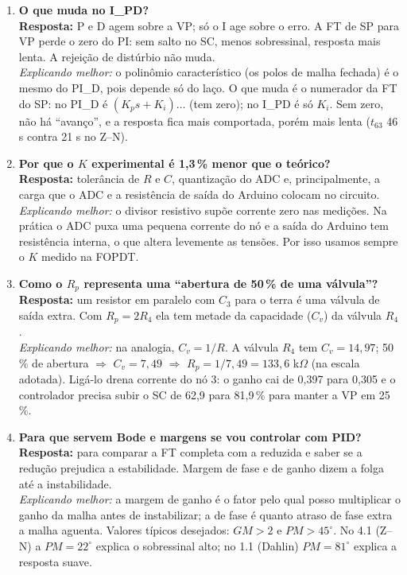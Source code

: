 \documentclass[11pt,a4paper]{article}
\newcommand{\Vc}[1]{V_{c#1}}
\newcommand{\Vin}{V_{in}}
\begin{document}
\begin{enumerate}[leftmargin=*]
\emph{Explicando melhor:} o SC máximo é 100\,\% (5 V) e em regime $\Vc3=K_3\cdot\Vin$. Logo $VP_{max}=0{,}397\cdot100$. Na prática, com $K$ medido, $\approx39{,}2\,\%$. Para qualquer SP, o SC em regime é $SP/K$ e precisa ficar entre 0 e 100\,\%.
\item \textbf{O que muda no I\_PD?}\\
\textbf{Resposta:} P e D agem sobre a VP; só o I age sobre o erro. A FT de SP para VP perde o zero do PI: sem salto no SC, menos sobressinal, resposta mais lenta. A rejeição de distúrbio não muda.\\
\emph{Explicando melhor:} o polinômio característico (os polos de malha fechada) é o mesmo do PI\_D, pois depende só do laço. O que muda é o numerador da FT do SP: no PI\_D é $(K_ps+K_i)\ldots$ (tem zero); no I\_PD é só $K_i$. Sem zero, não há ``avanço'', e a resposta fica mais comportada, porém mais lenta ($t_{63}$ 46 s contra 21 s no Z--N).
\item \textbf{Por que o $K$ experimental é 1,3\,\% menor que o teórico?}\\
\textbf{Resposta:} tolerância de $R$ e $C$, quantização do ADC e, principalmente, a carga que o ADC e a resistência de saída do Arduino colocam no circuito.\\
\emph{Explicando melhor:} o divisor resistivo supõe corrente zero nas medições. Na prática o ADC puxa uma pequena corrente do nó e a saída do Arduino tem resistência interna, o que altera levemente as tensões. Por isso usamos sempre o $K$ medido na FOPDT.
\item \textbf{Como o $R_p$ representa uma ``abertura de 50\,\% de uma válvula''?}\\
\textbf{Resposta:} um resistor em paralelo com $C_3$ para o terra é uma válvula de saída extra. Com $R_p=2R_4$ ela tem metade da capacidade ($C_v$) da válvula $R_4$.\\
\emph{Explicando melhor:} na analogia, $C_v=1/R$. A válvula $R_4$ tem $C_v=14{,}97$; 50\,\% de abertura $\Rightarrow$ $C_v=7{,}49$ $\Rightarrow$ $R_p=1/7{,}49=133{,}6$ k$\Omega$ (na escala adotada). Ligá-lo drena corrente do nó 3: o ganho cai de 0{,}397 para 0{,}305 e o controlador precisa subir o SC de 62{,}9 para 81{,}9\,\% para manter a VP em 25\,\%.
\item \textbf{Para que servem Bode e margens se vou controlar com PID?}\\
\textbf{Resposta:} para comparar a FT completa com a reduzida e saber se a redução prejudica a estabilidade. Margem de fase e de ganho dizem a folga até a instabilidade.\\
\emph{Explicando melhor:} a margem de ganho é o fator pelo qual posso multiplicar o ganho da malha antes de instabilizar; a de fase é quanto atraso de fase extra a malha aguenta. Valores típicos desejados: $GM>2$ e $PM>45^\circ$. No 4.1 (Z--N) a $PM=22^\circ$ explica o sobressinal alto; no 1.1 (Dahlin) $PM=81^\circ$ explica a resposta suave.
\end{enumerate}
\end{document}
